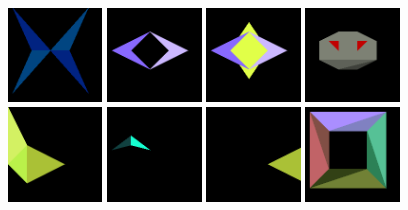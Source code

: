 \begin{figure}[H]
\includegraphics[width=2.5cm]{preface/obj2d/obj_25.png}
\includegraphics[width=2.5cm]{preface/obj2d/obj_26.png}
\includegraphics[width=2.5cm]{preface/obj2d/obj_27.png}
\includegraphics[width=2.5cm]{preface/obj2d/obj_28.png}
\includegraphics[width=2.5cm]{preface/obj2d/obj_29.png}
\includegraphics[width=2.5cm]{preface/obj2d/obj_3.png}
\includegraphics[width=2.5cm]{preface/obj2d/obj_30.png}
\includegraphics[width=2.5cm]{preface/obj2d/obj_31.png}

\end{figure}
